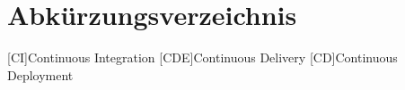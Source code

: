 \documentclass[oneside,11pt,titlepage,ngerman,a4paper,bibliography=totocnumbered,listof=numbered]{scrbook}
\begin{document}

\frontmatter



% 

\tableofcontents{}
\listoffigures{}
\chapter{Abkürzungsverzeichnis}
\begin{acronym}[EuGH]
[CI]{Continuous Integration}
[CDE]{Continuous Delivery}
[CD]{Continuous Deployment}
\end{acronym}
\mainmatter









\backmatter

\listoftables


\setwidesite{}						%
\label{cha:bibliography}





%	
\end{document}

